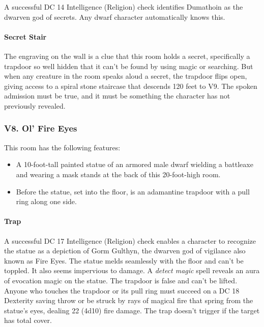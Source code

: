 \documentclass[10pt,a4paper,twoside,twocolumn,openany,nodeprecatedcode]{dndbook}
\begin{document}
A successful DC 14 Intelligence (Religion) check identifies Dumathoin as the dwarven god of secrets. Any dwarf character automatically knows this.
\paragraph{Secret Stair}
The engraving on the wall is a clue that this room holds a secret, specifically a trapdoor so well hidden that it can't be found by using magic or searching. But when any creature in the room speaks aloud a secret, the trapdoor flips open, giving access to a spiral stone staircase that descends 120 feet to V9. The spoken admission must be true, and it must be something the character has not previously revealed.
\subsubsection{V8. Ol' Fire Eyes}
This room has the following features:
\begin{itemize}

\item A 10-foot-tall painted statue of an armored male dwarf wielding a battleaxe and wearing a mask stands at the back of this 20-foot-high room.
\item Before the statue, set into the floor, is an adamantine trapdoor with a pull ring along one side.
\end{itemize}


\paragraph{Trap}
A successful DC 17 Intelligence (Religion) check enables a character to recognize the statue as a depiction of Gorm Gulthyn, the dwarven god of vigilance also known as Fire Eyes. The statue melds seamlessly with the floor and can't be toppled. It also seems impervious to damage. A \textit{detect magic} spell reveals an aura of evocation magic on the statue.
The trapdoor is false and can't be lifted. Anyone who touches the trapdoor or its pull ring must succeed on a DC 18 Dexterity saving throw or be struck by rays of magical fire that spring from the statue's eyes, dealing 22 (4d10) fire damage. The trap doesn't trigger if the target has total cover.
\end{document}
